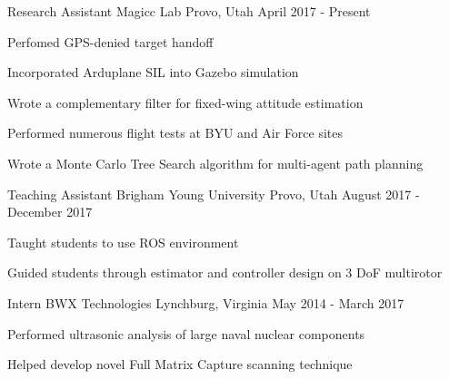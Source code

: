 

\begin{cventries}

  \cventry
    {Research Assistant} %
    {Magicc Lab} %
    {Provo, Utah} %
    {April 2017 - Present} %
    {
      \begin{cvitems} %
      \item  {Perfomed GPS-denied target handoff}
      \item  {Incorporated Arduplane SIL into Gazebo simulation}
      \item  {Wrote a complementary filter for fixed-wing attitude estimation}
      \item  {Performed numerous flight tests at BYU and Air Force sites}
      \item  {Wrote a Monte Carlo Tree Search algorithm for multi-agent path planning}
      \end{cvitems}
    }
  \cventry
    {Teaching Assistant} %
    {Brigham Young University} %
    {Provo, Utah} %
    {August 2017 - December 2017} %
    {
      \begin{cvitems} %
      \item {Taught students to use ROS environment} 
      \item {Guided students through estimator and controller design on 3 DoF multirotor}
      \end{cvitems}
    }
  \cventry
    {Intern} %
    {BWX Technologies} %
    {Lynchburg, Virginia} %
    {May 2014 - March 2017} %
    {
      \begin{cvitems} %
      \item  {Performed ultrasonic analysis of large naval nuclear components}
      \item  {Helped develop novel Full Matrix Capture scanning technique}
      \end{cvitems}
    }

\end{cventries}
